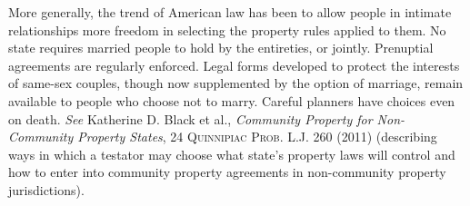 More generally, the trend of American law has been to allow people in intimate
relationships more freedom in selecting the property rules applied to them. No
state requires married people to hold by the entireties, or jointly.
Prenuptial agreements are regularly enforced. Legal forms developed to protect
the interests of same-sex couples, though now supplemented by the option of
marriage, remain available to people who choose not to marry. Careful planners
have choices even on death. \textit{See} Katherine D. Black et al.,
\emph{Community Property for Non-Community Property States}, 24
\textsc{Quinnipiac Prob. L.J.} 260 (2011) (describing ways in which a testator
may choose what state's property laws will control and how to enter into
community property agreements in non-community property jurisdictions).

